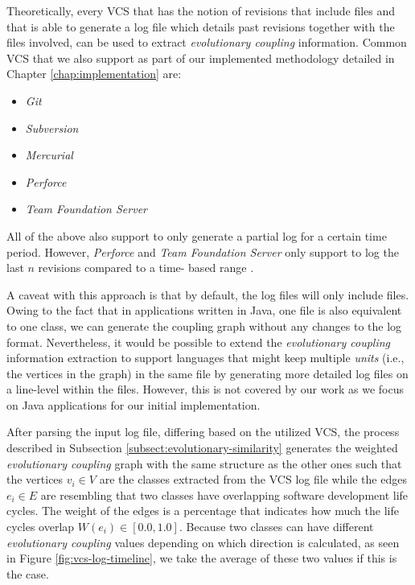 \documentclass[12pt,a4paper]{report}
\begin{document}
Theoretically, every VCS that has the notion of revisions that include files
and that is able to generate a log file which details past revisions together
with the files involved, can be used to extract \textit{evolutionary coupling}
information. Common VCS that we also support as part of our implemented
methodology detailed in Chapter \ref{chap:implementation} are:
\begin{itemize}[noitemsep]
  \item \textit{Git}
  \item \textit{Subversion}
  \item \textit{Mercurial}
  \item \textit{Perforce}
  \item \textit{Team Foundation Server}
\end{itemize}
All of the above also support to only generate a partial log for a
certain time period. However, \textit{Perforce} and \textit{Team Foundation
Server} only support to log the last \(n\) revisions compared to a time\hyp
based range \cite{perforce, team-foundation-server}.

A caveat with this approach is that by default, the log files will only include
files. Owing to the fact that in applications written in Java, one file is also
equivalent to one class, we can generate the coupling graph without any changes
to the log format. Nevertheless, it would be possible to extend the
\textit{evolutionary coupling} information extraction to support languages that
might keep multiple \textit{units} (i.e., the vertices in the graph) in the same
file by generating more detailed log files on a line-level within the files.
However, this is not covered by our work as we focus on Java applications for
our initial implementation.

After parsing the input log file, differing based on the utilized VCS, the
process described in Subsection \ref{subsect:evolutionary-similarity} generates
the weighted \textit{evolutionary coupling} graph with the same structure as
the other ones such that the vertices \(v_i \in V\) are the classes extracted
from the VCS log file while the edges \(e_i \in E\) are resembling that two
classes have overlapping software development life cycles. The weight of the
edges is a percentage that indicates how much the life cycles overlap
\(W(e_i) \in [0.0, 1.0]\). Because two classes can have different
\textit{evolutionary coupling} values depending on which direction is calculated,
as seen in Figure \ref{fig:vcs-log-timeline}, we take the average of these
two values if this is the case.
\end{document}
